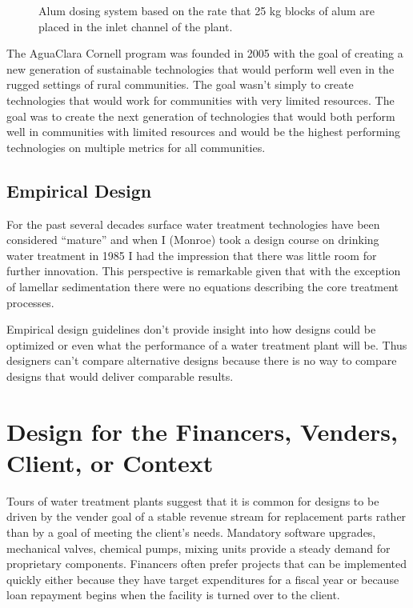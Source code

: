 \documentclass[letterpaper,10pt,english]{sphinxmanual}
\let\sphinxpxdimen\pdfpxdimen\else\newdimen\sphinxpxdimen
\begin{document}
\begin{figure}[htbp]
\centering
\capstart

\noindent\sphinxincludegraphics[width=300\sphinxpxdimen]{{Kathmandu_alum_dosing}.jpg}
\caption{Alum dosing system based on the rate that 25 kg blocks of alum are placed in the inlet channel of the plant.}\label{\detokenize{Introduction/Introduction:id17}}\label{\detokenize{Introduction/Introduction:figure-kathmandu-alum-dosing}}\end{figure}

The AguaClara Cornell program was founded in 2005 with the goal of creating a new generation of sustainable technologies that would perform well even in the rugged settings of rural communities. The goal wasn’t simply to create technologies that would work for communities with very limited resources. The goal was to create the next generation of technologies that would both perform well in communities with limited resources and would be the highest performing technologies on multiple metrics for all communities.


\subsection{Empirical Design}
\label{\detokenize{Introduction/Introduction:empirical-design}}\label{\detokenize{Introduction/Introduction:heading-empirical-design}}
For the past several decades surface water treatment technologies have been considered “mature” and when I (Monroe) took a design course on drinking water treatment in 1985 I had the impression that there was little room for further innovation. This perspective is remarkable given that with the exception of lamellar sedimentation there were no equations describing the core treatment processes.

Empirical design guidelines don’t provide insight into how designs could be optimized or even what the performance of a water treatment plant will be. Thus designers can’t compare alternative designs because there is no way to compare designs that would deliver comparable results.


\section{Design for the Financers, Venders, Client, or Context}
\label{\detokenize{Introduction/Introduction:design-for-the-financers-venders-client-or-context}}\label{\detokenize{Introduction/Introduction:heading-design-for-the-context}}
Tours of water treatment plants suggest that it is common for designs to be driven by the vender goal of a stable revenue stream for replacement parts rather than by a goal of meeting the client’s needs. Mandatory software upgrades, mechanical valves, chemical pumps, mixing units provide a steady demand for proprietary components. Financers often prefer projects that can be implemented quickly either because they have target expenditures for a fiscal year or because loan repayment begins when the facility is turned over to the client.
\end{document}
